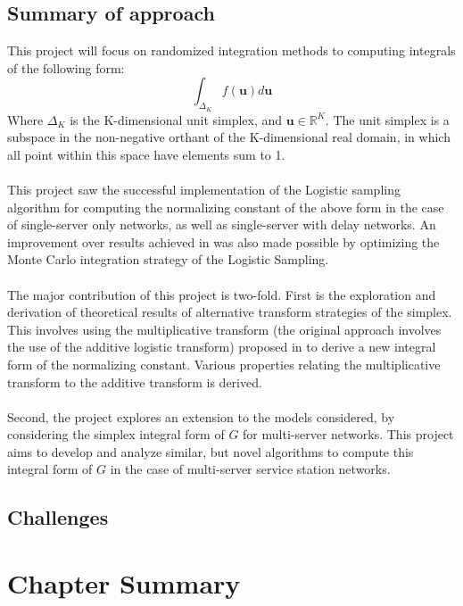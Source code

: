 \subsection{Summary of approach}
This project will focus on randomized integration methods to computing integrals of the following form:
\[\int_{\Delta_K} f(\mathbf{u}) d \mathbf{u}\]
Where \(\Delta_K\) is the K-dimensional unit simplex, and \(\mathbf{u} \in \mathbb{R}^K\). The unit simplex is a subspace in the non-negative orthant of the K-dimensional real domain, in which all point within this space have elements sum to 1.
\\\\
This project saw the successful implementation of the Logistic sampling algorithm for computing the normalizing constant of the above form in the case of single-server only networks, as well as single-server with delay networks. An improvement over results achieved in \cite{Casale2017AcceleratingMethods} was also made possible by optimizing the Monte Carlo integration strategy of the Logistic Sampling.
\\\\
The major contribution of this project is two-fold. First is the exploration and derivation of theoretical results of alternative transform strategies of the simplex. This involves using the multiplicative transform (the original approach involves the use of the additive logistic transform) proposed in \cite{Aitchison1982TheData} to derive a new integral form of the normalizing constant. Various properties relating the multiplicative transform to the additive transform is derived.
\\\\
Second, the project explores an extension to the models considered, by considering the simplex integral form of \(G\) for multi-server networks. This project aims to develop and analyze similar, but novel algorithms to compute this integral form of \(G\) in the case of multi-server service station networks. 

\subsection{Challenges}

\section{Chapter Summary}

